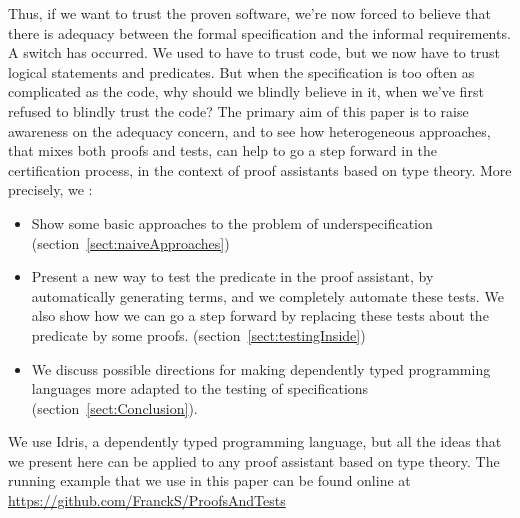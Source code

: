 Thus, if we want to trust the proven software, we're now forced to believe that there is adequacy between the formal specification and the informal requirements. A switch has occurred. We used to have to trust code, but we now have to trust logical statements and predicates. But when the specification is too often as complicated as the code, why should we blindly believe in it, when we've first refused to blindly trust the code? The primary aim of this paper is to raise awareness on the adequacy concern, and to see how heterogeneous approaches, that mixes both proofs and tests, can help to go a step forward in the certification process, in the context of proof assistants based on type theory.
More precisely, we :
\begin{itemize}
	\item Show some basic approaches to the problem of underspecification (section~\ref{sect:naiveApproaches})
	\item Present a new way to test the predicate in the proof assistant, by automatically generating terms, and we completely automate these tests. We also show how we can go a step forward by replacing these tests about the predicate by some proofs.  (section~\ref{sect:testingInside})
	\item We discuss possible directions for making dependently typed programming languages more adapted to the testing of specifications (section~\ref{sect:Conclusion}).
\end{itemize}

We use Idris, a dependently typed programming language, but all the ideas that we present here can be applied to any proof assistant based on type theory. The running example that we use in this paper can be found online at \url{https://github.com/FranckS/ProofsAndTests}

